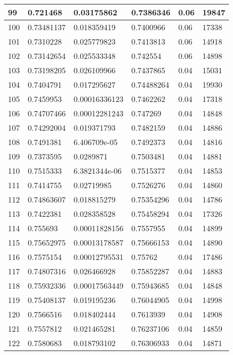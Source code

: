 \begin{longtable}{|l|l|l|l|l|l|}
99 & 0.721468 & 0.03175862 & 0.7386346 & 0.06 & 19847 \\ \hline 
100 & 0.73481137 & 0.018359419 & 0.7400966 & 0.06 & 17338 \\ \hline 
101 & 0.7310228 & 0.025779823 & 0.7413813 & 0.06 & 14918 \\ \hline 
102 & 0.73142654 & 0.025533348 & 0.742554 & 0.06 & 14898 \\ \hline 
103 & 0.73198205 & 0.026109966 & 0.7437865 & 0.04 & 15031 \\ \hline 
104 & 0.7404791 & 0.017295627 & 0.74488264 & 0.04 & 19930 \\ \hline 
105 & 0.7459953 & 0.00016336123 & 0.7462262 & 0.04 & 17318 \\ \hline 
106 & 0.74707466 & 0.00012281243 & 0.747269 & 0.04 & 14848 \\ \hline 
107 & 0.74292004 & 0.019371793 & 0.7482159 & 0.04 & 14886 \\ \hline 
108 & 0.7491381 & 6.406709e-05 & 0.7492373 & 0.04 & 14816 \\ \hline 
109 & 0.7373595 & 0.0289871 & 0.7503481 & 0.04 & 14881 \\ \hline 
110 & 0.7515333 & 6.3821344e-06 & 0.7515377 & 0.04 & 14853 \\ \hline 
111 & 0.7414755 & 0.02719985 & 0.7526276 & 0.04 & 14860 \\ \hline 
112 & 0.74863607 & 0.018815279 & 0.75354296 & 0.04 & 14786 \\ \hline 
113 & 0.7422381 & 0.028358528 & 0.75458294 & 0.04 & 17326 \\ \hline 
114 & 0.755693 & 0.00011828156 & 0.7557955 & 0.04 & 14899 \\ \hline 
115 & 0.75652975 & 0.00013178587 & 0.75666153 & 0.04 & 14890 \\ \hline 
116 & 0.7575154 & 0.00012795531 & 0.75762 & 0.04 & 17486 \\ \hline 
117 & 0.74807316 & 0.026466928 & 0.75852287 & 0.04 & 14883 \\ \hline 
118 & 0.75932336 & 0.00017563449 & 0.75943685 & 0.04 & 14848 \\ \hline 
119 & 0.75408137 & 0.019195236 & 0.76044905 & 0.04 & 14998 \\ \hline 
120 & 0.7566516 & 0.018402444 & 0.7613939 & 0.04 & 14908 \\ \hline 
121 & 0.7557812 & 0.021465281 & 0.76237106 & 0.04 & 14859 \\ \hline 
122 & 0.7580683 & 0.018793102 & 0.76306933 & 0.04 & 14871 \\ \hline 

\end{longtable}
